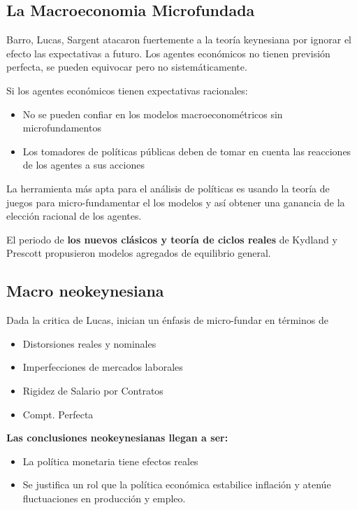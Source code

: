 \subsection{La Macroeconomia Microfundada}

Barro, Lucas, Sargent atacaron fuertemente a la teoría keynesiana por ignorar el efecto las expectativas a futuro. Los agentes económicos no tienen previsión perfecta, se pueden equivocar pero no sistemáticamente. 

Si los agentes económicos tienen expectativas racionales:
\begin{itemize}
    \item No se pueden confiar en los modelos macroeconométricos sin microfundamentos
    \item Los tomadores de políticas públicas deben de tomar en cuenta las reacciones de los agentes a sus acciones
\end{itemize}

La herramienta más apta para el análisis de políticas es usando la teoría de juegos para micro-fundamentar el los modelos y así obtener una ganancia de la elección racional de los agentes. 

El periodo de \textbf{los nuevos clásicos y teoría de ciclos reales} de Kydland y Prescott propusieron modelos agregados de equilibrio general. 

\subsection{Macro neokeynesiana}
Dada la critica de Lucas, inician un énfasis de micro-fundar en términos de
\begin{itemize}
    \item Distorsiones reales y nominales
    \item Imperfecciones de mercados laborales
    \item Rigidez de Salario por Contratos
    \item Compt. Perfecta
\end{itemize}

\textbf{Las conclusiones neokeynesianas llegan a ser:}
\begin{itemize}
    \item La política monetaria tiene efectos reales
    \item Se justifica un rol que la política económica estabilice inflación y atenúe fluctuaciones en producción y empleo. 
\end{itemize}

